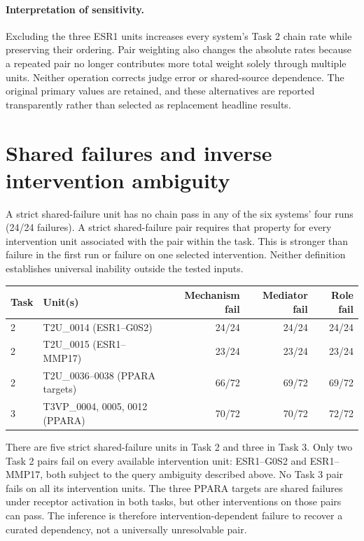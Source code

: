 \paragraph{Interpretation of sensitivity.} Excluding the three ESR1 units increases every system's Task 2 chain rate while preserving their ordering. Pair weighting also changes the absolute rates because a repeated pair no longer contributes more total weight solely through multiple units. Neither operation corrects judge error or shared-source dependence. The original primary values are retained, and these alternatives are reported transparently rather than selected as replacement headline results.

\clearpage
\section{Shared failures and inverse intervention ambiguity}\label{app:shared_failures}
A strict shared-failure unit has no chain pass in any of the six systems' four runs (24/24 failures). A strict shared-failure pair requires that property for every intervention unit associated with the pair within the task. This is stronger than failure in the first run or failure on one selected intervention. Neither definition establishes universal inability outside the tested inputs.

\begin{center}
\begin{tabular}{llrrr}
\toprule
Task & Unit(s) & Mechanism fail & Mediator fail & Role fail \\
\midrule
2 & T2U\_0014 (ESR1--G0S2) & 24/24 & 24/24 & 24/24 \\
2 & T2U\_0015 (ESR1--MMP17) & 23/24 & 23/24 & 23/24 \\
2 & T2U\_0036--0038 (PPARA targets) & 66/72 & 69/72 & 69/72 \\
3 & T3VP\_0004, 0005, 0012 (PPARA) & 70/72 & 70/72 & 72/72 \\
\bottomrule
\end{tabular}
\end{center}
There are five strict shared-failure units in Task 2 and three in Task 3. Only two Task 2 pairs fail on every available intervention unit: ESR1--G0S2 and ESR1--MMP17, both subject to the query ambiguity described above. No Task 3 pair fails on all its intervention units. The three PPARA targets are shared failures under receptor activation in both tasks, but other interventions on those pairs can pass. The inference is therefore intervention-dependent failure to recover a curated dependency, not a universally unresolvable pair.

